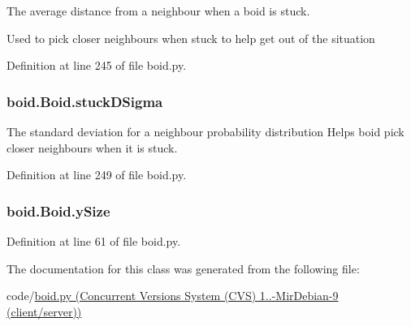 The average distance from a neighbour when a boid is stuck. 

Used to pick closer neighbours when stuck to help get out of the situation 

Definition at line 245 of file boid.\-py.

\hypertarget{classboid_1_1Boid_a03960faefd59c4a651442eb373aa5c15}{
\subsubsection[{stuck\-D\-Sigma}]{\setlength{\rightskip}{0pt plus 5cm}boid.\-Boid.\-stuck\-D\-Sigma}}\label{classboid_1_1Boid_a03960faefd59c4a651442eb373aa5c15}


The standard deviation for a neighbour probability distribution Helps boid pick closer neighbours when it is stuck. 



Definition at line 249 of file boid.\-py.

\hypertarget{classboid_1_1Boid_a09f8fe6b2deb64fd65cfd64fc01470b9}{
\subsubsection[{y\-Size}]{\setlength{\rightskip}{0pt plus 5cm}boid.\-Boid.\-y\-Size}}\label{classboid_1_1Boid_a09f8fe6b2deb64fd65cfd64fc01470b9}


Definition at line 61 of file boid.\-py.



The documentation for this class was generated from the following file\-:\begin{DoxyCompactItemize}
\item 
code/\hyperlink{boid_8py}{boid.\-py (\-Concurrent Versions System (\-C\-V\-S) 1..-\/\-Mir\-Debian-\/9 (client/server))}\end{DoxyCompactItemize}
